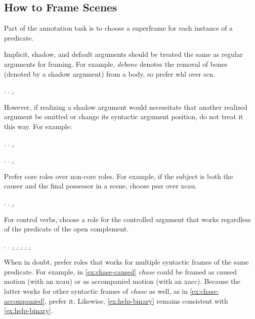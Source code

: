 \documentclass[a4paper]{article}
\begin{document}

\subsection{How to Frame Scenes}

Part of the annotation task is to choose a superframe for each instance of a predicate.

Implicit, shadow, and default arguments \citep{di-fabio-etal-2019-verbatlas} should
be treated the same as regular arguments for framing. For example,
\emph{debone} denotes the removal of bones (denoted by a shadow argument) from
a body, so prefer \textsf{whl} over \textsf{scn}.

\ex. \a. 
     \b. 

However, if realizing a shadow argument would necessitate that another realized
argument be omitted or change its syntactic argument position, do not treat it
this way. For example:

\ex. \a. 
     \b. 

\ex. \a. 
     \b. 

Prefer core roles over non-core roles. For example, if the subject is both the
causer and the final possessor in a scene, choose \textsf{pssr} over
\textsf{xcau}.

\ex. \a. 
     \b. 

For control verbs, choose a role for the controlled argument that works
regardless of the predicate of the open complement.

\ex.
\a. 
\b. 
\b. 
\b. 
\b. \label{ex:help-ternary} 
\b. 

When in doubt, prefer roles that works for multiple syntactic frames of the
same predicate. For example, in \ref{ex:chase-caused} \emph{chase} could be
framed as caused motion (with an \textsf{xcau}) or as accompanied motion (with
an \textsf{xacc}). Because the latter works for other syntactic frames of
\emph{chase} as well, as in \ref{ex:chase-accompanied}, prefer it. Likewise,
\ref{ex:help-binary} remains consistent with \ref{ex:help-binary}.
\end{document}
